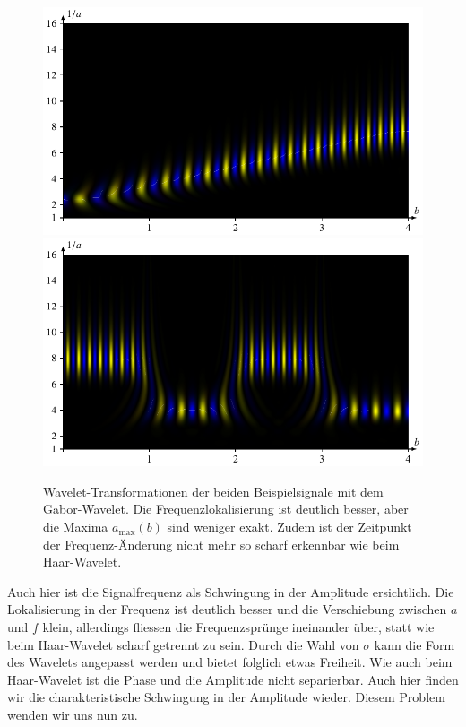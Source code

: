 \begin{figure}
	\centering
	\includegraphics{papers/complex/images/chirp_gabor.pdf}
	\includegraphics{papers/complex/images/square_gabor.pdf}
	\caption{Wavelet-Transformationen der beiden Beispielsignale mit dem Gabor-Wavelet.
		Die Frequenzlokalisierung ist deutlich besser, aber die Maxima $a_\text{max}(b)$ sind weniger exakt. Zudem ist der Zeitpunkt der Frequenz-Änderung nicht mehr so scharf erkennbar wie beim Haar-Wavelet.}
	\label{complex:gabor-ex}
\end{figure}

Auch hier ist die Signalfrequenz als Schwingung in der Amplitude ersichtlich. 
Die Lokalisierung in der Frequenz ist deutlich besser und die Verschiebung zwischen $a$ und $f$ klein, allerdings fliessen die Frequenzsprünge ineinander über, statt wie beim Haar-Wavelet scharf getrennt zu sein.
Durch die Wahl von $\sigma$ kann die Form des Wavelets angepasst werden und bietet folglich etwas Freiheit.
Wie auch beim Haar-Wavelet ist die Phase und die Amplitude nicht separierbar.
Auch hier finden wir die charakteristische Schwingung in der Amplitude wieder.
Diesem Problem wenden wir uns nun zu.